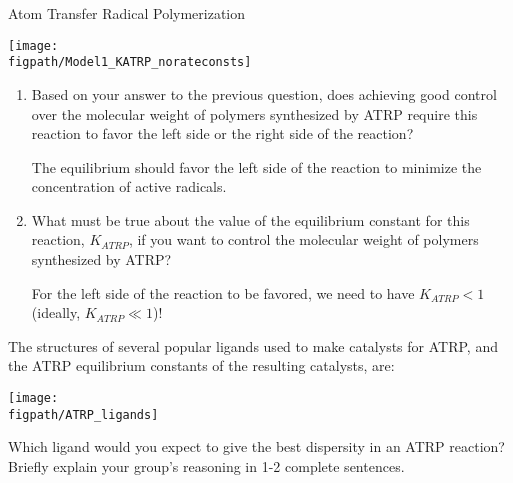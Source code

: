 \begin{activity}{Atom Transfer Radical Polymerization}
\begin{ctqs}
	\centerline{\texttt{[image: \\figpath/Model1\_KATRP\_norateconsts]}}
		
		\begin{enumerate}
			\item Based on your answer to the previous question, does achieving good control over the molecular weight of polymers synthesized by ATRP require this reaction to favor the left side or the right side of the reaction?
			
				\begin{solution}[0.9in]
				
					The equilibrium should favor the left side of the reaction to minimize the concentration of active radicals.
				
				\end{solution}
			
			\item What must be true about the value of the equilibrium constant for this reaction, $K_{ATRP}$, if you want to control the molecular weight of polymers synthesized by ATRP?
			
				\begin{solution}[0.9in]
				
					For the left side of the reaction to be favored,  we need to have $K_{ATRP}< 1$ (ideally, $K_{ATRP}\ll 1$)!
				
				\end{solution}
			
		\end{enumerate}

\end{ctqs}

\begin{infobox}
	The structures of several popular ligands used to make catalysts for ATRP, and the ATRP equilibrium constants of the resulting catalysts, are:
	
	\centerline{\texttt{[image: \\figpath/ATRP\_ligands]}}
\end{infobox}

\begin{ctqs}
	
	\question Which ligand would you expect to give the best dispersity in an ATRP reaction?  Briefly explain your group's reasoning in 1-2 complete sentences.
	
		\begin{solution}[1.25in]
\end{solution}
\end{ctqs}
\end{activity}
